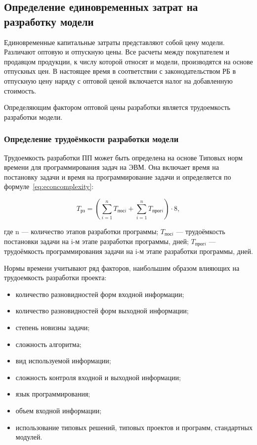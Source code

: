 \subsection{Определение единовременных затрат на разработку модели}

Единовременные капитальные затраты представляют собой цену модели. Различают оптовую и отпускную цены. Все расчеты между покупателем и продавцом продукции, к числу которой относят и модели, производятся на основе отпускных цен. В настоящее время в соответствии с законодательством РБ в отпускную цену наряду с оптовой ценой включается налог на добавленную стоимость.

Определяющим фактором оптовой цены разработки является трудоемкость разработки модели.

\subsubsection{Определение трудоёмкости разработки модели}

Трудоемкость разработки ПП может быть определена на основе Типовых норм времени для программирования задач на ЭВМ. Она включает время на постановку задачи и время на программирование задачи и определяется по формуле~\ref{eq:econcomplexity}:

\begin{equation}
    \label{eq:econcomplexity}
    T_{рз} = (\sum\limits_{i=1}^n T_{посi} + \sum\limits_{i=1}^n T_{прогi}) \cdot 8,
\end{equation}

где n --- количество этапов разработки программы;
$T_{посi}$ --- трудоёмкость постановки задачи на i-м этапе разработки программы, дней;
$T_{прогi}$ --- трудоёмкость программирования задачи на i-м этапе разработки программы, дней.

Нормы времени учитывают ряд факторов, наибольшим образом влияющих на трудоемкость разработки проекта:

\begin{itemize}
    \item количество разновидностей форм входной информации;
    \item количество разновидностей форм выходной информации;
    \item степень новизны задачи;
    \item сложность алгоритма;
    \item вид используемой информации;
    \item сложность контроля входной и выходной информации;
    \item язык программирования;
    \item объем входной информации;
    \item использование типовых решений, типовых проектов и программ, стандартных модулей.
\end{itemize}

